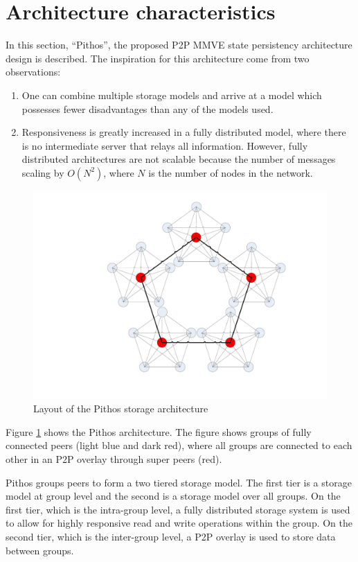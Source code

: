 \documentclass[10pt,a4paper,conference]{IEEEtran}
\begin{document}
\section{Architecture characteristics}
\label{design}

In this section, ``Pithos'', the proposed P2P MMVE state persistency architecture design is described. The inspiration for this architecture come
from two observations:
%
\begin{enumerate}
  \item One can combine multiple storage models and arrive at a model which possesses fewer disadvantages than any of the models used.
  \item Responsiveness is greatly increased in a fully distributed model, where there is no intermediate server that relays all information.
      However, fully distributed architectures are not scalable because the number of messages scaling by $O(N^2)$, where $N$ is the number of
      nodes in the network.
\end{enumerate}

\begin{figure}[htbp]
 \centering
 \includegraphics[clip=true, viewport=7.5cm 2.5cm 26cm 20cm, width=0.7\columnwidth]{CDHT_layout}
 \caption{Layout of the Pithos storage architecture}
 \label{fig_pithos}
\end{figure}
%
Figure \ref{fig_pithos} shows the Pithos architecture. The figure shows groups of fully connected peers (light blue and dark red), where all groups
are connected to each other in an P2P overlay through super peers (red).

Pithos groups peers to form a two tiered storage model. The first tier is a storage model at group level and the second is a storage model over all
groups. On the first tier, which is the intra-group level, a fully distributed storage system is used to allow for highly responsive read and write
operations within the group. On the second tier, which is the inter-group level, a P2P overlay is used to store data between groups.
\end{document}
